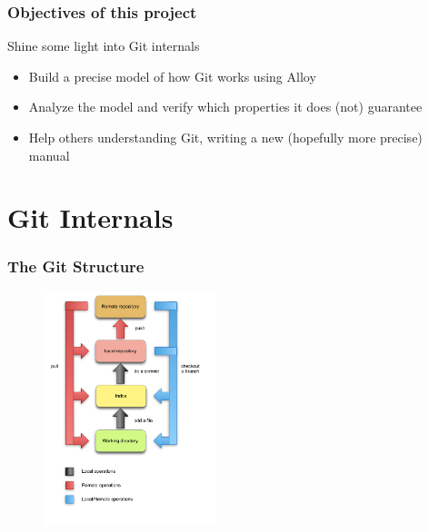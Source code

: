 \documentclass{beamer}
\begin{document}
\begin{frame}
	\frametitle{Objectives of this project}
	\begin{block}{Shine some light into Git internals}
		\begin{itemize}
			\item Build a precise model of how Git works using Alloy
			\item Analyze the model and verify which properties it
			does (not) guarantee
			\item Help others understanding Git, writing a new
			(hopefully more precise) manual
		\end{itemize}
	\end{block}
\end{frame}


\section{Git Internals}

\begin{frame}
   \frametitle{The Git Structure}
   \begin{figure}
      \centering
      \includegraphics[width=0.45\textwidth]{images/git_workflow.png}
   \end{figure}
\end{frame}
\end{document}
